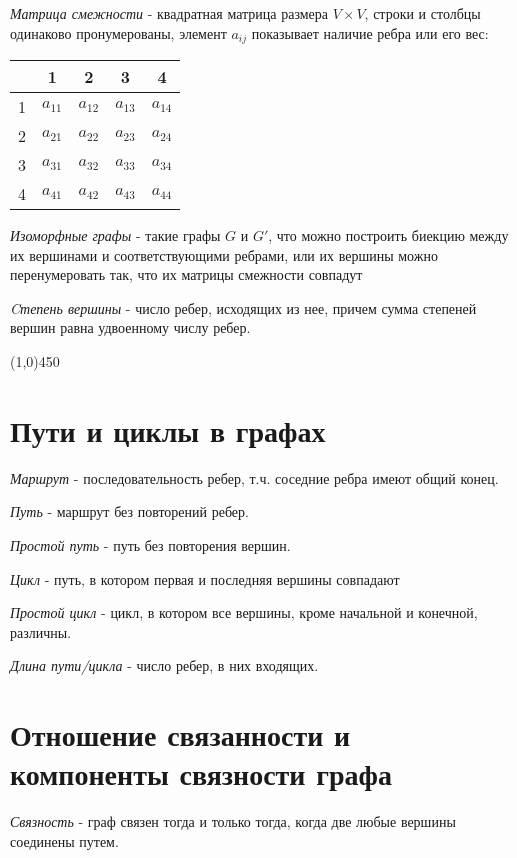 \documentclass[a4paper,12pt]{article}
\begin{document}
	\textit{Матрица смежности} - квадратная матрица размера $V \times V$, строки и столбцы одинаково пронумерованы, элемент $a_{ij}$ показывает наличие ребра или его вес:
	\begin{center}
		\begin{tabular}{c|c|c|c|c}
			&1	&2	&3	&4 	\\ \hline
			1	&$a_{11}$	&$a_{12}$	&$a_{13}$	&$a_{14}$ \\ \hline
			2	&$a_{21}$	&$a_{22}$	&$a_{23}$	&$a_{24}$	\\ \hline
			3	&$a_{31}$	&$a_{32}$	&$a_{33}$	&$a_{34}$	\\ \hline
			4	&$a_{41}$	&$a_{42}$	&$a_{43}$	&$a_{44}$ 
		\end{tabular}
	\end{center}
	
	
	
	\textit{Изоморфные графы} - такие графы $G$ и $G'$, что можно построить биекцию между их вершинами и соответствующими ребрами, или их вершины можно перенумеровать так, что их матрицы смежности совпадут
	
	\textit{Cтепень вершины} - число ребер, исходящих из нее, причем сумма степеней вершин равна удвоенному числу ребер.
	
	\begin{center}
		\line(1,0){450}
	\end{center}
	
	\section*{Пути и циклы в графах}
	\textit{Маршрут} - последовательность ребер, т.ч. соседние ребра имеют общий конец.
	
	\textit{Путь} - маршрут без повторений ребер.
	
	\textit{Простой путь} - путь без повторения вершин.
	
	\textit{Цикл} - путь, в котором первая и последняя вершины совпадают 
	
	\textit{Простой цикл} - цикл, в котором все вершины, кроме начальной и конечной, различны.
	
	\textit{Длина пути/цикла} - число ребер, в них входящих.
	
	\section*{Отношение связанности и компоненты связности графа}
	\textit{Связность} - граф связен тогда и только тогда, когда две любые вершины соединены путем.
	
\end{document}
